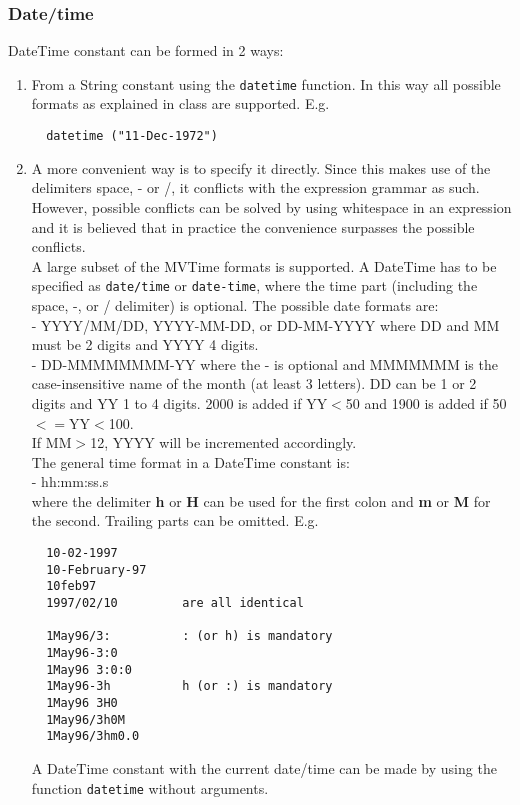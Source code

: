 \subsubsection{\label{TAQL:DATETIMECONST}Date/time}
  DateTime constant can be formed in 2 ways:
  \begin{enumerate}
  \item From a String constant using the \texttt{datetime} function.
    In this way all possible formats as explained in class
    are supported. E.g.
\begin{verbatim}
  datetime ("11-Dec-1972")
\end{verbatim}
  \item A more convenient way is to specify it directly. Since this
    makes use of the delimiters space, - or /, it conflicts with the
    expression grammar as such. However, possible conflicts can be
    solved by using whitespace in an expression and it is believed
    that in practice the convenience surpasses the possible
    conflicts.
    \\A large subset of the MVTime formats is supported.
    A DateTime has to be specified as \texttt{date/time}
    or \texttt{date-time}, where the time part (including
    the space, -, or / delimiter) is optional.
    The possible date formats are:
    \\- YYYY/MM/DD, YYYY-MM-DD, or DD-MM-YYYY where DD and MM must
    be 2 digits and YYYY 4 digits.
    \\- DD-MMMMMMMM-YY where the - is optional and MMMMMMM is the
    case-insensitive name of the month (at least 3 letters). 
    DD can be 1 or 2 digits and YY 1 to 4 digits. 2000 is added if YY$<$50 and
    1900 is added if 50$<=$YY$<$100.
    \\If MM$>$12, YYYY will be incremented accordingly.
    \\The general time format in a DateTime constant is:
    \\- hh:mm:ss.s
    \\where the delimiter \textbf{h} or \textbf{H} can be used
    for the first colon and \textbf{m} or \textbf{M} for the second.
    Trailing parts can be omitted. E.g.
\begin{verbatim}
  10-02-1997
  10-February-97
  10feb97
  1997/02/10         are all identical

  1May96/3:          : (or h) is mandatory
  1May96-3:0
  1May96 3:0:0
  1May96-3h          h (or :) is mandatory
  1May96 3H0
  1May96/3h0M
  1May96/3hm0.0
\end{verbatim}
    A DateTime constant with the current date/time can be made
    by using the function \texttt{datetime} without arguments.
  \end{enumerate}

